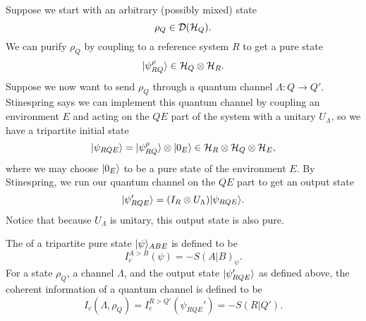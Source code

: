 Suppose we start with an arbitrary (possibly mixed) state
\begin{equation}
    \rho_Q \in \mathcal{D}(\mathcal H_Q).
\end{equation}
We can purify $\rho_Q$ by coupling to a reference system $R$ to get a pure state
\begin{equation}
    \lvert\psi^\rho_{RQ}\rangle\in \mathcal H_Q\otimes \mathcal H_R.
\end{equation}
Suppose we now want to send $\rho_Q$ through a quantum channel $\Lambda:Q\to Q'$. Stinespring says we can implement this quantum channel by coupling an environment $E$ and acting on the $QE$ part of the system with a unitary $U_\Lambda$, so we have a tripartite initial state
\begin{equation}
    \lvert\psi_{RQE}\rangle=\lvert\psi^\rho_{RQ}\rangle\otimes \lvert0_E\rangle \in \mathcal H_R \otimes \mathcal H_Q \otimes \mathcal H_E,
\end{equation}
where we may choose $\lvert0_E\rangle$ to be a pure state of the environment $E$. By Stinespring, we run our quantum channel on the $QE$ part to get an output state
\begin{equation}
    \lvert\psi_{RQE}'\rangle=(I_R \otimes U_\Lambda)\lvert\psi_{RQE}\rangle.
\end{equation}
Notice that because $U_\Lambda$ is unitary, this output state is also pure.
\begin{defn}
    The  of a tripartite pure state $\lvert\psi\rangle_{ABE}$ is defined to be
    \begin{equation}
        I_c^{A>B}(\psi)=-S(A|B)_\psi.
    \end{equation}
    For a state $\rho_Q$, a channel $\Lambda$, and the output state $\lvert\psi_{RQE}'\rangle$ as defined above, the coherent information of a quantum channel is defined to be
    \begin{equation}
        I_c(\Lambda,\rho_Q)=I_c^{R>Q'}(\psi_{RQE}')=-S(R|Q').
    \end{equation}
\end{defn}

